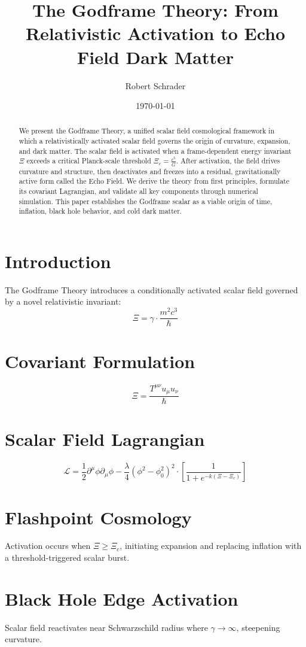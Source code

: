 \documentclass[11pt]{article}
\title{The Godframe Theory: From Relativistic Activation to Echo Field Dark Matter}
\author{Robert Schrader}
\date{\today}
\begin{document}
\maketitle

\begin{abstract}
We present the Godframe Theory, a unified scalar field cosmological framework in which
a relativistically activated scalar field governs the origin of curvature, expansion, and dark
matter. The scalar field is activated when a frame-dependent energy invariant \(\Xi\) exceeds a
critical Planck-scale threshold \(\Xi_c = \frac{c^5}{G}\). After activation, the field drives curvature and structure,
then deactivates and freezes into a residual, gravitationally active form called the Echo Field.
We derive the theory from first principles, formulate its covariant Lagrangian, and validate all
key components through numerical simulation. This paper establishes the Godframe scalar as
a viable origin of time, inflation, black hole behavior, and cold dark matter.
\end{abstract}

\section{Introduction}
The Godframe Theory introduces a conditionally activated scalar field governed by a novel relativistic invariant:
\[
\Xi = \gamma \cdot \frac{m^2 c^3}{\hbar}
\]

\section{Covariant Formulation}
\[
\Xi = \frac{T^{\mu\nu} u_\mu u_\nu}{\hbar}
\]

\section{Scalar Field Lagrangian}
\[
\mathcal{L} = \frac{1}{2} \partial^\mu \phi \partial_\mu \phi - \frac{\lambda}{4} (\phi^2 - \phi_0^2)^2 \cdot \left[\frac{1}{1 + e^{-k(\Xi - \Xi_c)}}\right]
\]

\section{Flashpoint Cosmology}
Activation occurs when \(\Xi \geq \Xi_c\), initiating expansion and replacing inflation with a threshold-triggered scalar burst.

\section{Black Hole Edge Activation}
Scalar field reactivates near Schwarzschild radius where \(\gamma \to \infty\), steepening curvature.
\end{document}
